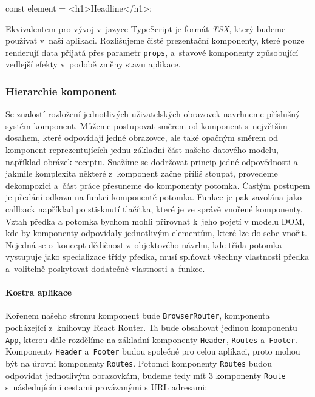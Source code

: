 \begin{code}
const element = <h1>Headline</h1>;
\end{code}

Ekvivalentem pro vývoj v~jazyce TypeScript je formát \emph{TSX}, který budeme používat v~naší aplikaci. Rozlišujeme čistě prezentační komponenty, které pouze renderují data přijatá přes parametr \texttt{props}, a~stavové komponenty způsobující vedlejší efekty v~podobě změny stavu aplikace.

\subsubsection{Hierarchie komponent}

Se znalostí rozložení jednotlivých uživatelských obrazovek navrhneme příslušný systém komponent. Můžeme postupovat směrem od komponent s~největším dosahem, které odpovídají jedné obrazovce, ale také opačným směrem od komponent reprezentujících jednu základní část našeho datového modelu, například obrázek receptu. Snažíme se dodržovat princip jedné odpovědnosti a jakmile komplexita některé z~komponent začne příliš stoupat, provedeme dekompozici a~část práce přesuneme do komponenty potomka. Častým postupem je předání odkazu na funkci komponentě potomka. Funkce je pak zavolána jako callback například po stisknutí tlačítka, které je ve správě vnořené komponenty. Vztah předka a potomka bychom mohli přirovnat k~jeho pojetí v modelu DOM, kde by komponenty odpovídaly jednotlivým elementům, které lze do sebe vnořit. Nejedná se o~koncept dědičnost z~objektového návrhu, kde třída potomka vystupuje jako specializace třídy předka, musí splňovat všechny vlastnosti předka a~volitelně poskytovat dodatečné vlastnosti a~funkce.

\paragraph{Kostra aplikace}

Kořenem našeho stromu komponent bude \texttt{BrowserRouter}, komponenta pocházející z~knihovny React Router. Ta bude obsahovat jedinou komponentu \texttt{App}, kterou dále rozdělíme na základní komponenty \texttt{Header}, \texttt{Routes} a~\texttt{Footer}. Komponenty \texttt{Header} a~\texttt{Footer} budou společné pro celou aplikaci, proto mohou být na úrovni komponenty \texttt{Routes}. Potomci komponenty \texttt{Routes} budou odpovídat jednotlivým obrazovkám, budeme tedy mít $3$ komponenty \texttt{Route} s~následujícími cestami provázanými s URL adresami:


